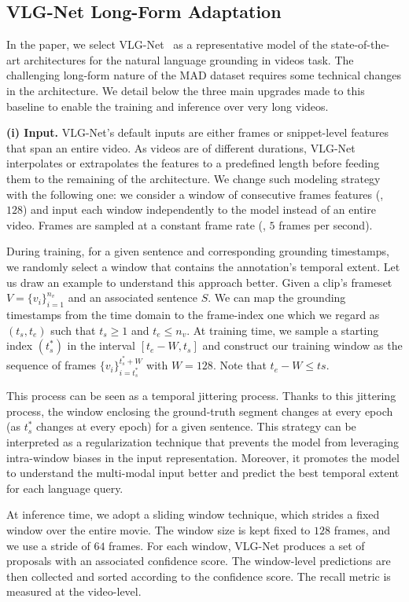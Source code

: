 \documentclass[10pt,twocolumn,letterpaper]{article}
\begin{document}
\subsection{VLG-Net Long-Form Adaptation}
In the paper, we select VLG-Net~\cite{soldan2021vlg} as a representative model of the state-of-the-art architectures for the natural language grounding in videos task. 
The challenging long-form nature of the MAD dataset requires some technical changes in the architecture. We detail below the three main upgrades made to this baseline to enable the training and inference over very long videos. 

\textbf{(i) Input.} VLG-Net's default inputs are either frames or snippet-level features that span an entire video. As videos are of different durations, VLG-Net interpolates or extrapolates the features to a predefined length before feeding them to the remaining of the architecture. We change such modeling strategy with the following one: we consider a window of consecutive frames features (\ie, $128$) and input each window independently to the model instead of an entire video. 
Frames are sampled at a constant frame rate (\ie, $5$ frames per second).

During training, for a given sentence and corresponding grounding timestamps, we randomly select a window that contains the annotation's temporal extent. Let us draw an example to understand this approach better. Given a clip's frameset $V=\{v_i\}_{i=1}^{n_v}$ and an associated sentence $S$. We can map the grounding timestamps from the time domain to the frame-index one which we regard as $(t_s,t_e)$ such that $t_s \geq 1$ and $t_e \leq n_v$. At training time, we sample a starting index $(t_s^*)$ in the interval $[t_e - W, t_s]$ and construct our training window as the sequence of frames $\{v_i\}_{i=t_s^*}^{t_s^*+W}$ with $W=128$. Note that $t_e - W \leq ts $.

This process can be seen as a temporal jittering process.
Thanks to this jittering process, the window enclosing the ground-truth segment changes at every epoch (as $t_s^*$ changes at every epoch) for a given sentence. This strategy can be interpreted as a regularization technique that prevents the model from leveraging intra-window biases in the input representation. Moreover, it promotes the model to understand the multi-modal input better and predict the best temporal extent for each language query. 

At inference time, we adopt a sliding window technique, which strides a fixed window over the entire movie. The window size is kept fixed to $128$ frames, and we use a stride of $64$ frames.
For each window, VLG-Net produces a set of proposals with an associated confidence score.
The window-level predictions are then collected and sorted according to the confidence score. The recall metric is measured at the video-level. 
\end{document}
